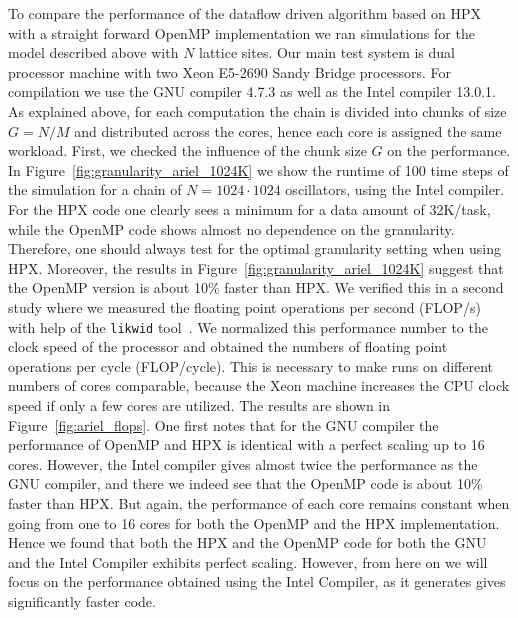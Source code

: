 \documentclass[10pt]{elsarticle}
\begin{document}
To compare the performance of the dataflow driven algorithm based on HPX with a straight forward OpenMP implementation we ran simulations for the model described above with $N$ lattice sites.
Our main test system is dual processor machine with two Xeon E5-2690 Sandy Bridge processors.
For compilation we use the GNU compiler 4.7.3 as well as the Intel compiler 13.0.1.
As explained above, for each computation the chain is divided into chunks of size $G=N/M$ and distributed across the cores, hence each core is assigned the same workload.
First, we checked the influence of the chunk size $G$ on the performance.
In Figure~\ref{fig:granularity_ariel_1024K} we show the runtime of 100 time steps of the simulation for a chain of $N=1024\cdot1024$ oscillators, using the Intel compiler.
For the HPX code one clearly sees a minimum for a data amount of 32K/task, while the OpenMP code shows almost no dependence on the granularity.
Therefore, one should always test for the optimal granularity setting when using HPX.
Moreover, the results in Figure~\ref{fig:granularity_ariel_1024K} suggest that the OpenMP version is about 10\% faster than HPX.
We verified this in a second study where we measured the floating point operations per second (FLOP/s) with help of the \lstinline+likwid+ tool~\cite{likwid}.
We normalized this performance number to the clock speed of the processor and obtained the numbers of floating point operations per cycle (FLOP/cycle).
This is necessary to make runs on different numbers of cores comparable, because the Xeon machine increases the CPU clock speed if only a few cores are utilized.
The results are shown in Figure~\ref{fig:ariel_flops}.
One first notes that for the GNU compiler the performance of OpenMP and HPX is identical with a perfect scaling up to 16 cores.
However, the Intel compiler gives almost twice the performance as the GNU compiler, and there we indeed see that the OpenMP code is about 10\% faster than HPX.
But again, the performance of each core remains constant when going from one to 16 cores for both the OpenMP and the HPX implementation.
Hence we found that both the HPX and the OpenMP code for both the GNU and the Intel Compiler exhibits perfect scaling.
However, from here on we will focus on the performance obtained using the Intel Compiler, as it generates gives significantly faster code.
\end{document}
